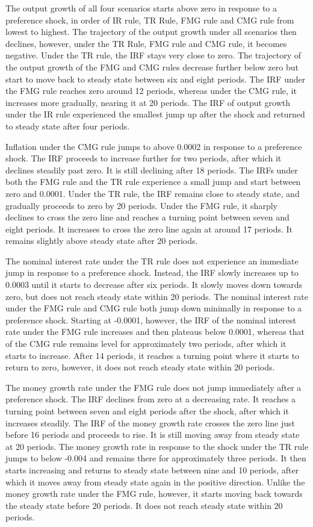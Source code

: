 \documentclass[11pt,preprint, authoryear]{elsarticle}
\numberwithin{equation}{section}
\numberwithin{figure}{section}
\numberwithin{table}{section}
\begin{document}
The output growth of all four scenarios starts above zero in response to
a preference shock, in order of IR rule, TR Rule, FMG rule and CMG rule
from lowest to highest. The trajectory of the output growth under all
scenarios then declines, however, under the TR Rule, FMG rule and CMG
rule, it becomes negative. Under the TR rule, the IRF stays very close
to zero. The trajectory of the output growth of the FMG and CMG rules
decrease further below zero but start to move back to steady state
between six and eight periods. The IRF under the FMG rule reaches zero
around 12 periods, whereas under the CMG rule, it increases more
gradually, nearing it at 20 periods. The IRF of output growth under the
IR rule experienced the smallest jump up after the shock and returned to
steady state after four periods.

Inflation under the CMG rule jumps to above 0.0002 in response to a
preference shock. The IRF proceeds to increase further for two periods,
after which it declines steadily past zero. It is still declining after
18 periods. The IRFs under both the FMG rule and the TR rule experience
a small jump and start between zero and 0.0001. Under the TR rule, the
IRF remains close to steady state, and gradually proceeds to zero by 20
periods. Under the FMG rule, it sharply declines to cross the zero line
and reaches a turning point between seven and eight periods. It
increases to cross the zero line again at around 17 periods. It remains
slightly above steady state after 20 periods.

The nominal interest rate under the TR rule does not experience an
immediate jump in response to a preference shock. Instead, the IRF
slowly increases up to 0.0003 until it starts to decrease after six
periods. It slowly moves down towards zero, but does not reach steady
state within 20 periods. The nominal interest rate under the FMG rule
and CMG rule both jump down minimally in response to a preference shock.
Starting at -0.0001, however, the IRF of the nominal interest rate under
the FMG rule increases and then plateaus below 0.0001, whereas that of
the CMG rule remains level for approximately two periods, after which it
starts to increase. After 14 periods, it reaches a turning point where
it starts to return to zero, however, it does not reach steady state
within 20 periods.

The money growth rate under the FMG rule does not jump immediately after
a preference shock. The IRF declines from zero at a decreasing rate. It
reaches a turning point between seven and eight periods after the shock,
after which it increases steadily. The IRF of the money growth rate
crosses the zero line just before 16 periods and proceeds to rise. It is
still moving away from steady state at 20 periods. The money growth rate
in response to the shock under the TR rule jumps to below -0.004 and
remains there for approximately three periods. It then starts increasing
and returns to steady state between nine and 10 periods, after which it
moves away from steady state again in the positive direction. Unlike the
money growth rate under the FMG rule, however, it starts moving back
towards the steady state before 20 periods. It does not reach steady
state within 20 periods.
\end{document}
